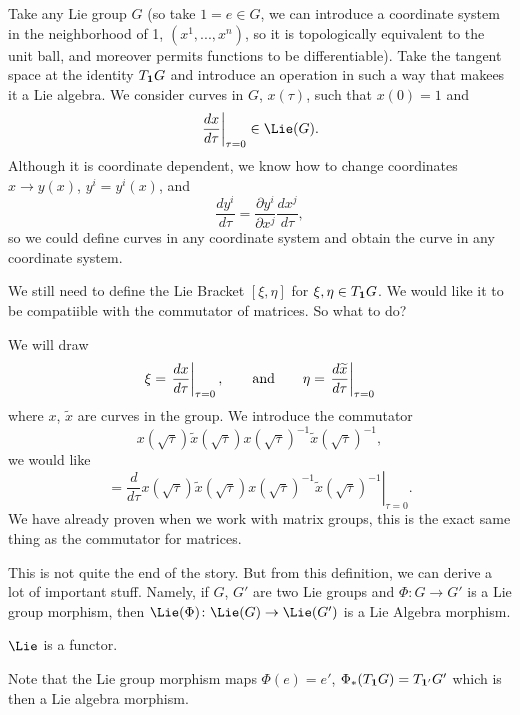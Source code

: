 Take any Lie group $G$ (so take $1=e\in G$, we can introduce a
coordinate system in the neighborhood of 1, $(x^1,...,x^n)$,
so it is topologically equivalent to the unit ball, and moreover
permits functions to be differentiable). Take the tangent space
at the identity $T_{{\bf 1}}G$ and introduce an operation in such
a way that makees it a Lie algebra. We consider curves in $G$,
$x(\tau)$, such that $x(0)=1$ and
\begin{equation}
\left.\frac{dx}{d\tau}\right|_{\tau=0}\in\Lie(G).
\end{equation}
Although it is coordinate dependent, we know how to change
coordinates $x\to y(x)$, $y^i=y^i(x)$, and
\begin{equation}
\frac{dy^i}{d\tau}=\frac{\partial y^i}{\partial x^j}\frac{d x^j}{d\tau},
\end{equation}
so we could define curves in any coordinate system and obtain the
curve in any coordinate system.

We still need to define the Lie Bracket $[\xi,\eta]$ for
$\xi,\eta\in T_{{\bf 1}}G$. We would like it to be compatiible
with the commutator of matrices. So what to do?

We will draw
\begin{equation}
\xi=\left.\frac{dx}{d\tau}\right|_{\tau=0},\qquad\hbox{and}\qquad\eta=\left.\frac{d\widetilde{x}}{d\tau}\right|_{\tau=0}
\end{equation}
where $x$, $\widetilde{x}$ are curves in the group. We introduce
the commutator
\begin{equation}
x(\sqrt{\tau})\widetilde{x}(\sqrt{\tau})x(\sqrt{\tau})^{-1}\widetilde{x}(\sqrt{\tau})^{-1},
\end{equation}
we would like
\begin{equation}
[\xi,\eta]=\left.\frac{d}{d\tau}x(\sqrt{\tau})\widetilde{x}(\sqrt{\tau})x(\sqrt{\tau})^{-1}\widetilde{x}(\sqrt{\tau})^{-1}\right|_{\tau=0}.
\end{equation}
We have already proven when we work with matrix groups, this is
the exact same thing as the commutator for matrices.

This is not quite the end of the story. But from this definition,
we can derive a lot of important stuff. Namely, if $G$, $G'$ are
two Lie groups and $\Phi\colon G\to G'$ is a Lie group morphism,
then $\Lie(\Phi)\colon\Lie(G)\to\Lie(G')$ is a Lie Algebra
morphism.
\medbreak
\begin{prop}
$\Lie$ is a functor.
\end{prop}
\medbreak
Note that the Lie group morphism maps $\Phi(e)=e'$,
$\Phi_{*}(T_{{\bf 1}}G)=T_{{\bf 1}'}G'$ which is then a Lie
algebra morphism.

